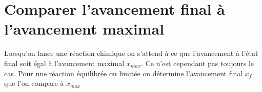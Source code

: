 \documentclass[a4paper,11pt,fleqn]{article}%
\begin{document}
\section{Comparer l'avancement final à l'avancement maximal}
Lorsqu'on lance une réaction chimique on s'attend à ce que l'avancement à l'état final soit égal à l'avancement maximal $x_{max}$. Ce n'est cependant pas toujours le cas. Pour une réaction équilibrée ou limitée on détermine l'avancement final $x_f$ que l'on compare à $x_{max}$
\end{document}
